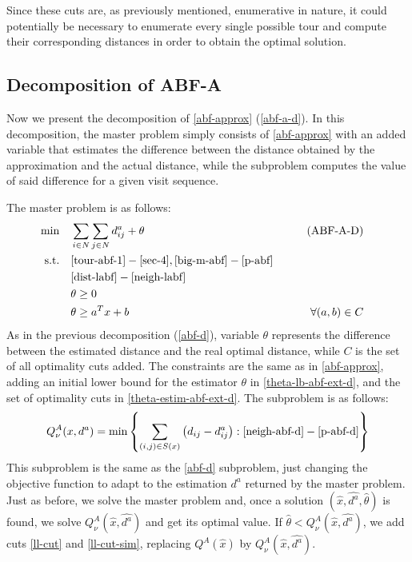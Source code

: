 \documentclass[pdflatex,sn-mathphys-num]{sn-jnl}%
\begin{document}
Since these cuts are, as previously mentioned, enumerative in nature, it could potentially be necessary to enumerate every single possible tour and compute their corresponding distances in order to obtain the optimal solution.

\subsection{Decomposition of ABF-A}

Now we present the decomposition of \ref{abf-approx} (\ref{abf-a-d}). In this decomposition, the master problem simply consists of \ref{abf-approx} with an added variable that estimates the difference between the distance obtained by the approximation and the actual distance, while the subproblem computes the value of said difference for a given visit sequence.

The master problem is as follows:
\begin{subequations}
\begin{align}
\min &&& \sum_{i \in N}\sum_{j\in N} d_{ij}^a +\theta & \tag{ABF-A-D} \label{abf-a-d}\\
\text{s.t.} &&& \eqref{tour-abf-1}-\eqref{sec-4}, \eqref{big-m-abf}-\eqref{p-abf}& \nonumber \\
&&& \eqref{dist-labf}-\eqref{neigh-labf}  & \nonumber\\
&&& \theta \geq 0 & \label{theta-lb-abf-ext-d}\\
&&& \theta \geq a^Tx + b & \forall (a,b) \in C & \label{theta-estim-abf-ext-d}
\end{align}
\end{subequations}
As in the previous decomposition (\ref{abf-d}), variable $\theta$ represents the difference between the estimated distance and the real optimal distance, while $C$ is the set of all optimality cuts added. The constraints are the same as in \ref{abf-approx}, adding an initial lower bound for the estimator $\theta$ in \eqref{theta-lb-abf-ext-d}, and the set of optimality cuts in \eqref{theta-estim-abf-ext-d}.
The subproblem is as follows:
\begin{equation}
Q^A_\nu(x, d^a) = \min \left\{ \sum_{(i,j) \in S(x)} \left(d_{ij} - d_{ij}^a\right) : \eqref{neigh-abf-d}-\eqref{p-abf-d} \right\} 
\end{equation}
This subproblem is the same as the \ref{abf-d} subproblem, just changing the objective function to adapt to the estimation $d^a$ returned by the master problem. Just as before, we solve the master problem and, once a solution $(\hat{x}, \hat{d^a}, \hat{\theta})$ is found, we solve $Q^A_\nu(\hat{x},\hat{d^a})$ and get its optimal value. If $\hat{\theta} < Q^A_\nu(\hat{x},\hat{d^a})$, we add cuts \eqref{ll-cut} and \eqref{ll-cut-sim}, replacing $Q^A(\hat{x})$ by $Q^A_\nu(\hat{x},\hat{d^a})$.
\end{document}
